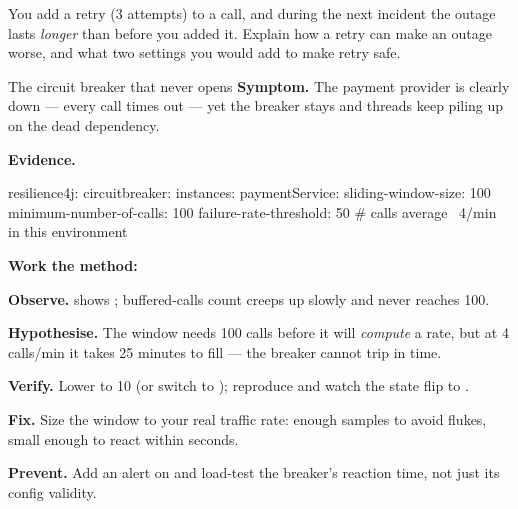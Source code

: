 \begin{thinkbox}
You add a retry (3 attempts) to a call, and during the next incident the outage lasts \emph{longer} than before you added it. Explain how a retry can make an outage worse, and what two settings you would add to make retry safe.
\end{thinkbox}


\begin{debuglab}{The circuit breaker that never opens}
\textbf{Symptom.} The payment provider is clearly down --- every call times out --- yet the breaker stays  and threads keep piling up on the dead dependency.

\smallskip\textbf{Evidence.}
\begin{yamlbox}
resilience4j:
  circuitbreaker:
    instances:
      paymentService:
        sliding-window-size: 100
        minimum-number-of-calls: 100
        failure-rate-threshold: 50
        # calls average ~4/min in this environment
\end{yamlbox}

\textbf{Work the method:}
\begin{tickcheck}
  \item \textbf{Observe.}  shows ; buffered-calls count creeps up slowly and never reaches 100.
  \item \textbf{Hypothesise.} The window needs 100 calls before it will \emph{compute} a rate, but at 4 calls/min it takes 25 minutes to fill --- the breaker cannot trip in time.
  \item \textbf{Verify.} Lower  to 10 (or switch to ); reproduce and watch the state flip to .
  \item \textbf{Fix.} Size the window to your real traffic rate: enough samples to avoid flukes, small enough to react within seconds.
  \item \textbf{Prevent.} Add an alert on  and load-test the breaker's reaction time, not just its config validity.
\end{tickcheck}
\end{debuglab}

